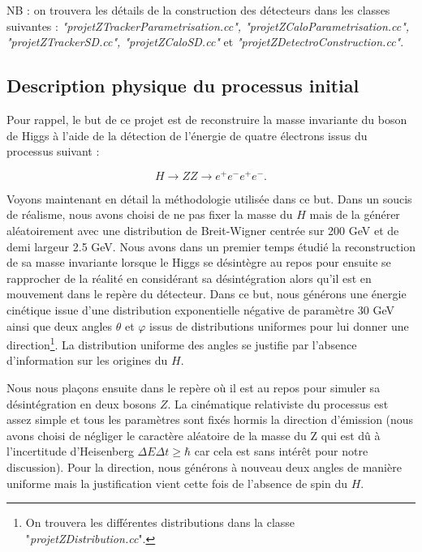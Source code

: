 \documentclass[11pt]{article}
\begin{document}
NB : on trouvera les détails de la construction des détecteurs dans les classes
suivantes : \textit{"projetZTrackerParametrisation.cc",
"projetZCaloParametrisation.cc", "projetZTrackerSD.cc", "projetZCaloSD.cc"} et 
\textit{"projetZDetectroConstruction.cc"}. 



\subsection{Description physique du processus initial}

Pour rappel, le but de ce projet est de reconstruire la masse invariante du
boson de Higgs à l'aide de la détection de l'énergie de quatre électrons issus
du processus suivant :

\begin{equation}
H \longrightarrow ZZ \longrightarrow e^+ e^- e^+ e^-.
\end{equation}

Voyons maintenant en détail la méthodologie utilisée dans ce but. Dans un
soucis de réalisme, nous avons choisi de ne pas fixer la masse du $H$ mais
de la générer aléatoirement avec une distribution de Breit-Wigner centrée sur
200 GeV et de demi largeur 2.5 GeV. Nous avons dans un premier temps étudié la reconstruction de sa masse
invariante lorsque le Higgs se désintègre au repos pour ensuite se rapprocher
de la réalité en considérant sa désintégration alors qu'il est en mouvement dans
le repère du détecteur. Dans ce but, nous générons une énergie cinétique issue
d'une distribution exponentielle négative de paramètre 30 GeV ainsi que deux
angles $\theta$ et $\varphi$ issus de distributions uniformes pour lui donner
une direction\footnote{On trouvera les différentes distributions dans la classe
"\textit{projetZDistribution.cc}".}. La distribution uniforme des angles se
justifie par l'absence d'information sur les origines du $H$. 

Nous nous plaçons
ensuite dans le repère où il est au repos pour simuler sa désintégration en deux
bosons $Z$. La cinématique relativiste du processus est assez simple et tous les
paramètres sont fixés hormis la direction d'émission (nous avons choisi de
négliger le caractère aléatoire de la masse du Z qui est dû à l'incertitude
d'Heisenberg $\Delta E \Delta t \geq \hbar$ car cela est sans intérêt pour notre
discussion). Pour la direction, nous générons à nouveau deux angles de manière
uniforme mais la justification vient cette fois de l'absence de spin du $H$. 
\end{document}
